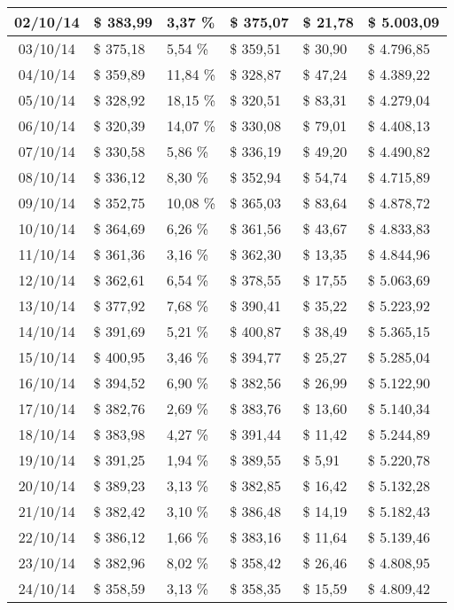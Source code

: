 \begin{small}
\begin{longtable}{|c|l|l|l|l|l|}
02/10/14 & \$ 383,99 & 3,37 \% & \$ 375,07 & \$ 21,78 & \$ 5.003,09 \\ \hline
03/10/14 & \$ 375,18 & 5,54 \% & \$ 359,51 & \$ 30,90 & \$ 4.796,85 \\ \hline
04/10/14 & \$ 359,89 & 11,84 \% & \$ 328,87 & \$ 47,24 & \$ 4.389,22 \\ \hline
05/10/14 & \$ 328,92 & 18,15 \% & \$ 320,51 & \$ 83,31 & \$ 4.279,04 \\ \hline
06/10/14 & \$ 320,39 & 14,07 \% & \$ 330,08 & \$ 79,01 & \$ 4.408,13 \\ \hline
07/10/14 & \$ 330,58 & 5,86 \% & \$ 336,19 & \$ 49,20 & \$ 4.490,82 \\ \hline
08/10/14 & \$ 336,12 & 8,30 \% & \$ 352,94 & \$ 54,74 & \$ 4.715,89 \\ \hline
09/10/14 & \$ 352,75 & 10,08 \% & \$ 365,03 & \$ 83,64 & \$ 4.878,72 \\ \hline
10/10/14 & \$ 364,69 & 6,26 \% & \$ 361,56 & \$ 43,67 & \$ 4.833,83 \\ \hline
11/10/14 & \$ 361,36 & 3,16 \% & \$ 362,30 & \$ 13,35 & \$ 4.844,96 \\ \hline
12/10/14 & \$ 362,61 & 6,54 \% & \$ 378,55 & \$ 17,55 & \$ 5.063,69 \\ \hline
13/10/14 & \$ 377,92 & 7,68 \% & \$ 390,41 & \$ 35,22 & \$ 5.223,92 \\ \hline
14/10/14 & \$ 391,69 & 5,21 \% & \$ 400,87 & \$ 38,49 & \$ 5.365,15 \\ \hline
15/10/14 & \$ 400,95 & 3,46 \% & \$ 394,77 & \$ 25,27 & \$ 5.285,04 \\ \hline
16/10/14 & \$ 394,52 & 6,90 \% & \$ 382,56 & \$ 26,99 & \$ 5.122,90 \\ \hline
17/10/14 & \$ 382,76 & 2,69 \% & \$ 383,76 & \$ 13,60 & \$ 5.140,34 \\ \hline
18/10/14 & \$ 383,98 & 4,27 \% & \$ 391,44 & \$ 11,42 & \$ 5.244,89 \\ \hline
19/10/14 & \$ 391,25 & 1,94 \% & \$ 389,55 & \$ 5,91 & \$ 5.220,78 \\ \hline
20/10/14 & \$ 389,23 & 3,13 \% & \$ 382,85 & \$ 16,42 & \$ 5.132,28 \\ \hline
21/10/14 & \$ 382,42 & 3,10 \% & \$ 386,48 & \$ 14,19 & \$ 5.182,43 \\ \hline
22/10/14 & \$ 386,12 & 1,66 \% & \$ 383,16 & \$ 11,64 & \$ 5.139,46 \\ \hline
23/10/14 & \$ 382,96 & 8,02 \% & \$ 358,42 & \$ 26,46 & \$ 4.808,95 \\ \hline
24/10/14 & \$ 358,59 & 3,13 \% & \$ 358,35 & \$ 15,59 & \$ 4.809,42 \\ \hline

\end{longtable}
\end{small}
